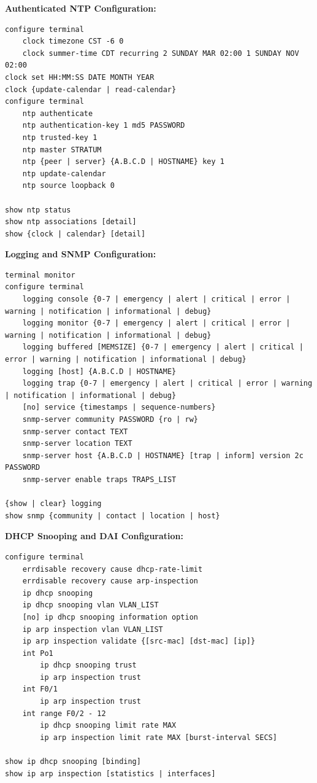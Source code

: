 \documentclass[12pt]{article}
\begin{document}
	\textbf{Authenticated NTP Configuration:}
	\begin{lstlisting}
configure terminal
	clock timezone CST -6 0
	clock summer-time CDT recurring 2 SUNDAY MAR 02:00 1 SUNDAY NOV 02:00
clock set HH:MM:SS DATE MONTH YEAR
clock {update-calendar | read-calendar}
configure terminal
	ntp authenticate
	ntp authentication-key 1 md5 PASSWORD
	ntp trusted-key 1
	ntp master STRATUM
	ntp {peer | server} {A.B.C.D | HOSTNAME} key 1
	ntp update-calendar
	ntp source loopback 0

show ntp status
show ntp associations [detail]
show {clock | calendar} [detail]
	\end{lstlisting}

	\textbf{Logging and SNMP Configuration:}
	\begin{lstlisting}
terminal monitor
configure terminal
	logging console {0-7 | emergency | alert | critical | error | warning | notification | informational | debug}
	logging monitor {0-7 | emergency | alert | critical | error | warning | notification | informational | debug}
	logging buffered [MEMSIZE] {0-7 | emergency | alert | critical | error | warning | notification | informational | debug}
	logging [host] {A.B.C.D | HOSTNAME}
	logging trap {0-7 | emergency | alert | critical | error | warning | notification | informational | debug}
	[no] service {timestamps | sequence-numbers}
	snmp-server community PASSWORD {ro | rw}
	snmp-server contact TEXT
	snmp-server location TEXT
	snmp-server host {A.B.C.D | HOSTNAME} [trap | inform] version 2c PASSWORD
	snmp-server enable traps TRAPS_LIST

{show | clear} logging
show snmp {community | contact | location | host}
	\end{lstlisting}

	\textbf{DHCP Snooping and DAI Configuration:}
	\begin{lstlisting}
configure terminal
	errdisable recovery cause dhcp-rate-limit
	errdisable recovery cause arp-inspection
	ip dhcp snooping
	ip dhcp snooping vlan VLAN_LIST
	[no] ip dhcp snooping information option
	ip arp inspection vlan VLAN_LIST
	ip arp inspection validate {[src-mac] [dst-mac] [ip]}
	int Po1
		ip dhcp snooping trust
		ip arp inspection trust
	int F0/1
		ip arp inspection trust
	int range F0/2 - 12
		ip dhcp snooping limit rate MAX
		ip arp inspection limit rate MAX [burst-interval SECS]

show ip dhcp snooping [binding]
show ip arp inspection [statistics | interfaces]
	\end{lstlisting}
\end{document}
